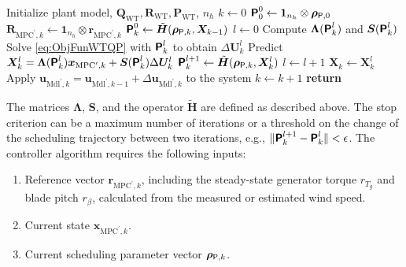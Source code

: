 \begin{algorithm}
    \caption{qLMPC}\label{algo:qLPVMPC}
    \begin{algorithmic}[1]
        \State Initialize plant model, \(\bm{Q}_{\text{WT}}, \bm{R}_{\text{WT}}, \bm{P}_{\text{WT}}\), \(n_h\)
        \State \(k \gets 0\)
        \State \(\bm{\mathsf{P}}^0_{0} \gets \bm{1}_{n_h} \otimes \bm{\rho}_{\mathsf{P},0}\) 
        \State \(\bm{R}_{\text{MPC}^\prime,k} \gets \bm{1}_{n_h} \otimes \bm{r}_{\text{MPC}^\prime,k}\)
        \State \(\bm{\mathsf{P}}^0_{k} \gets \tilde{\bm{H}}(\bm{\rho}_{\mathsf{P},k}, \bm{X}_{k-1})\) 
        \EndIf
        \State \(l \gets 0\)
        \State Compute \(\bm{\Lambda}(\bm{\mathsf{P}}_k^l)\) and \(\bm{S}(\bm{\mathsf{P}}_k^l)\)
        \State Solve \eqref{eq:ObjFunWTQP} with \(\bm{\mathsf{P}}_k^l\) to obtain \(\Delta\bm{U}_k^l\)
        \State Predict \(\bm{X}_k^l = \bm{\Lambda}(\bm{\mathsf{P}}_k^l)\bm{x}_{\text{MPC}^\prime,k} + \bm{S}(\bm{\mathsf{P}}_k^l) \Delta\bm{U}_k^l\)
        \State \(\bm{\mathsf{P}}^{l+1}_{k} \gets \tilde{\bm{H}}(\bm{\rho}_{\mathsf{P},k}, \bm{X}_k^l)\)
        \State \(l \gets l + 1\)
        \EndWhile
        \State \(\bm{X}_k \gets \bm{X}_k^{l}\) 
        \State Apply \(\bm{u}_{\text{Mdl}^\prime,k} = \bm{u}_{\text{Mdl}^\prime,k-1} + \Delta\bm{u}_{\text{Mdl}^\prime,k}\) to the system
        \State \(k \gets k + 1\)
        \EndWhile
        \State \textbf{return}
        \EndProcedure
    \end{algorithmic}
\end{algorithm}
%
The matrices \(\bm{\Lambda}\), \(\bm{S}\), and the operator \(\tilde{\bm{H}}\) are defined as described above. The stop criterion can be a maximum number of iterations or a threshold on the change of the scheduling trajectory between two iterations, e.g., $\|\bm{\mathsf{P}}_k^{l+1} - \bm{\mathsf{P}}_k^{l}\| < \epsilon$.
%
The controller algorithm requires the following inputs:
\begin{enumerate}
    \item Reference vector \(\bm{r}_{\text{MPC}^\prime,k}\), including the steady-state generator torque $r_{T_g}$ and blade pitch $r_\beta$, calculated from the measured or estimated wind speed.
    \item Current state \(\bm{x}_{\text{MPC}^\prime,k}\).
    \item Current scheduling parameter vector $\bm{\rho}_{\mathsf{P},k}$.
\end{enumerate}
